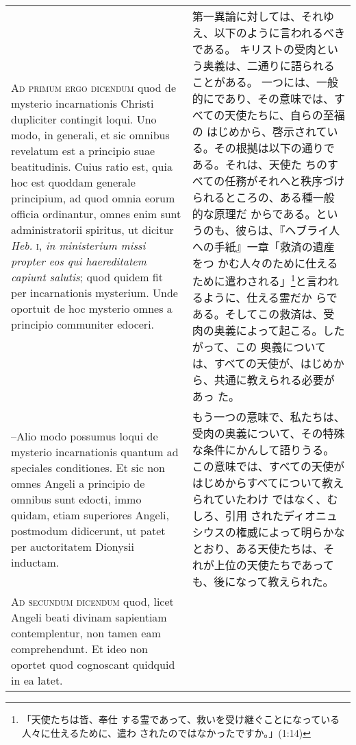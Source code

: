 \documentclass[10pt]{jsarticle} %
\begin{document}
\begin{longtable}{p{21em}p{21em}}
\\


{\scshape Ad primum ergo dicendum} quod de mysterio
incarnationis Christi dupliciter contingit loqui. Uno modo, in generali,
et sic omnibus revelatum est a principio suae beatitudinis. Cuius ratio
est, quia hoc est quoddam generale principium, ad quod omnia eorum
officia ordinantur, omnes enim sunt administratorii spiritus, ut dicitur
{\itshape Heb.} {\scshape i}, {\itshape in ministerium missi propter eos qui haereditatem capiunt
salutis}; quod quidem fit per incarnationis mysterium. Unde oportuit de
hoc mysterio omnes a principio communiter edoceri. 


&

第一異論に対しては、それゆえ、以下のように言われるべきである。
キリストの受肉という奥義は、二通りに語られることがある。
一つには、一般的にであり、その意味では、すべての天使たちに、自らの至福の
 はじめから、啓示されている。その根拠は以下の通りである。それは、天使た
 ちのすべての任務がそれへと秩序づけられるところの、ある種一般的な原理だ
 からである。というのも、彼らは、『ヘブライ人への手紙』一章「救済の遺産をつ
 かむ人々のために仕えるために遣わされる」\footnote{「天使たちは皆、奉仕
 する霊であって、救いを受け継ぐことになっている人々に仕えるために、遣わ
 されたのではなかったですか。」(1:14)}と言われるように、仕える霊だか
 らである。そしてこの救済は、受肉の奥義によって起こる。したがって、この
 奥義については、すべての天使が、はじめから、共通に教えられる必要があっ
 た。



\\

--Alio modo possumus
loqui de mysterio incarnationis quantum ad speciales conditiones. Et sic
non omnes Angeli a principio de omnibus sunt edocti, immo quidam, etiam
superiores Angeli, postmodum didicerunt, ut patet per auctoritatem
Dionysii inductam.

&

もう一つの意味で、私たちは、受肉の奥義について、その特殊な条件にかんして語りうる。
 この意味では、すべての天使がはじめからすべてについて教えられていたわけ
 ではなく、むしろ、引用
 されたディオニュシウスの権威によって明らかなとおり、ある天使たちは、そ
 れが上位の天使たちであっても、後になって教えられた。

\\


{\scshape Ad secundum dicendum} quod, licet Angeli beati
divinam sapientiam contemplentur, non tamen eam comprehendunt. Et ideo
non oportet quod cognoscant quidquid in ea latet.



\end{longtable}
\end{document}
